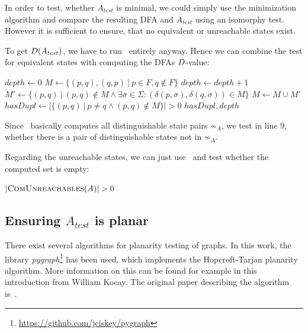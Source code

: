 In order to test, whether $A_{test}$ is minimal, we could simply use the minimization algorithm and compare the resulting DFA and $A_{test}$ using an isomorphy test. However it is sufficient to ensure, that no equivalent or unreachable states exist.

To get $D(A_{test})$, we have to run \CompDist\ entirely anyway. Hence we can combine the test for equivalent states with computing the DFAs $D$-value:
\vspace{0.2cm}
\begin{algorithmic}[1]
		\State $depth \gets 0$
		\State $M \gets \{ (p,q), (q,p)\ |\ p \in F, q \notin F \}$
		\Do
			\State $depth \gets depth + 1$
			\State $M' \gets \{ (p,q)\ |\ (p,q) \notin M \land \exists \sigma \in \Sigma \colon (\delta(p,\sigma), \delta(q,\sigma)) \in M \}$
			\State $M \gets M \cup M'$
		\State $hasDupl \gets | \{ (p,q)\ |\ p \neq q \land (p,q) \notin M \} | > 0$
		\State \Return $hasDupl, depth$
	\EndFunction
\end{algorithmic}
\vspace{0.2cm}
Since \CompDist\ basically computes all distinguishable state pairs $\not\sim_A$, we test in line $9$, whether there is a pair of distinguishable states not in $\not\sim_A$.

Regarding the unreachable states, we can just use \CompUnr\ and test whether the computed set is empty:
\vspace{0.2cm}
\begin{algorithmic}[1]
	\State \Return $|\textsc{ComUnreachables}(A)| > 0$
	\EndFunction
\end{algorithmic}

\subsection{Ensuring $A_{test}$ is planar}

There exist several algorithms for planarity testing of graphs. In this work, the library \emph{pygraph}\footnote{\url{https://github.com/jciskey/pygraph}} has been used, which implements the Hopcroft-Tarjan planarity algorithm. More information on this can be found for example in this~\cite{kocay93} introduction from William Kocay. The original paper describing the algorithm is~\cite{hopcroft74Planarity}.

